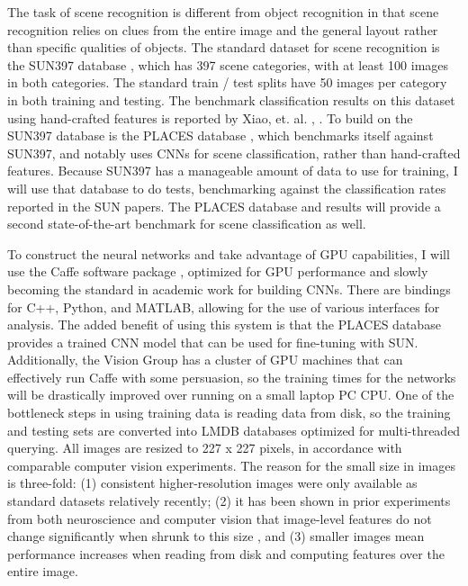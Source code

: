 \documentclass[10pt]{article}
\begin{document}
The task of scene recognition is different from object recognition in that scene recognition relies on clues from the entire image and the general layout rather than specific qualities of objects. The standard dataset for scene recognition is the SUN397 database \cite{xiao_sun_2010}, which has 397 scene categories, with at least 100 images in both categories. The standard train / test splits have 50 images per category in both training and testing. The benchmark classification results on this dataset using hand-crafted features is reported by Xiao, et. al. \cite{xiao_sun_2010}, \cite{xiao_sun_2014}. To build on the SUN397 database is the PLACES database \cite{zhou_learning_2014}, which benchmarks itself against SUN397, and notably uses CNNs for scene classification, rather than hand-crafted features. Because SUN397 has a manageable amount of data to use for training, I will use that database to do tests, benchmarking against the classification rates reported in the SUN papers. The PLACES database and results will provide a second state-of-the-art benchmark for scene classification as well.

To construct the neural networks and take advantage of GPU capabilities, I will use the Caffe software package \cite{jia_caffe:_2014}, optimized for GPU performance and slowly becoming the standard in academic work for building CNNs. There are bindings for C++, Python, and MATLAB, allowing for the use of various interfaces for analysis. The added benefit of using this system is that the PLACES database provides a trained CNN model that can be used for fine-tuning with SUN. Additionally, the Vision Group has a cluster of GPU machines that can effectively run Caffe with some persuasion, so the training times for the networks will be drastically improved over running on a small laptop PC CPU. One of the bottleneck steps in using training data is reading data from disk, so the training and testing sets are converted into LMDB databases optimized for multi-threaded querying. All images are resized to 227 x 227 pixels, in accordance with comparable computer vision experiments. The reason for the small size in images is three-fold: (1) consistent higher-resolution images were only available as standard datasets relatively recently; (2) it has been shown in prior experiments from both neuroscience and computer vision that image-level features do not change significantly when shrunk to this size \cite{donahue_decaf:_2014}, and (3) smaller images mean performance increases when reading from disk and computing features over the entire image.
\end{document}
